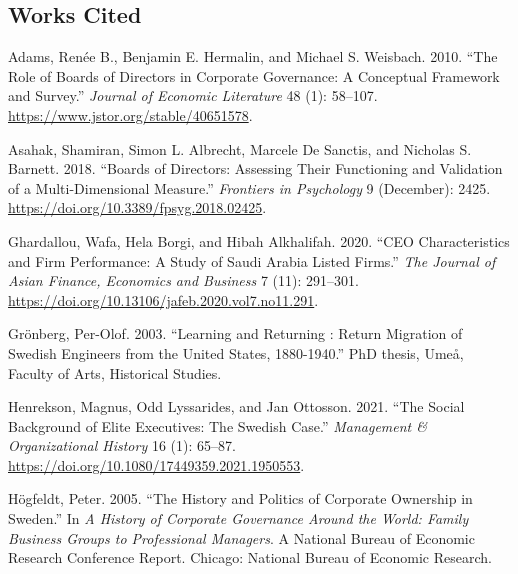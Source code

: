 \documentclass[
]{article}
\newlength{\cslhangindent}
\newenvironment{CSLReferences}[2] %
 {\begin{list}{}{%
  \setlength{\itemindent}{0pt}
  \setlength{\leftmargin}{0pt}
  \setlength{\parsep}{0pt}
  \ifodd #1
   \setlength{\leftmargin}{\cslhangindent}
   \setlength{\itemindent}{-1\cslhangindent}
  \fi
  \setlength{\itemsep}{#2\baselineskip}}}
 {\end{list}}
\begin{document}
\newpage{}

\subsection*{Works Cited}\label{works-cited}

\label{refs}
\begin{CSLReferences}{1}{0}
Adams, Renée B., Benjamin E. Hermalin, and Michael S. Weisbach. 2010.
{``The {Role} of {Boards} of {Directors} in {Corporate Governance}: {A
Conceptual Framework} and {Survey}.''} \emph{Journal of Economic
Literature} 48 (1): 58--107.
\url{https://www.jstor.org/stable/40651578}.

Asahak, Shamiran, Simon L. Albrecht, Marcele De Sanctis, and Nicholas S.
Barnett. 2018. {``Boards of {Directors}: {Assessing Their Functioning}
and {Validation} of a {Multi-Dimensional Measure}.''} \emph{Frontiers in
Psychology} 9 (December): 2425.
\url{https://doi.org/10.3389/fpsyg.2018.02425}.

Ghardallou, Wafa, Hela Borgi, and Hibah Alkhalifah. 2020. {``{CEO
Characteristics} and {Firm Performance}: {A Study} of {Saudi Arabia
Listed Firms}.''} \emph{The Journal of Asian Finance, Economics and
Business} 7 (11): 291--301.
\url{https://doi.org/10.13106/jafeb.2020.vol7.no11.291}.

Grönberg, Per-Olof. 2003. {``Learning and {Returning} : {Return
Migration} of {Swedish Engineers} from the {United States},
1880-1940.''} PhD thesis, Ume{å}, Faculty of Arts, Historical Studies.

Henrekson, Magnus, Odd Lyssarides, and Jan Ottosson. 2021. {``The Social
Background of Elite Executives: The {Swedish} Case.''} \emph{Management
\& Organizational History} 16 (1): 65--87.
\url{https://doi.org/10.1080/17449359.2021.1950553}.

Högfeldt, Peter. 2005. {``The {History} and {Politics} of {Corporate
Ownership} in {Sweden}.''} In \emph{A History of Corporate Governance
Around the World: Family Business Groups to Professional Managers}. A
{National} Bureau of Economic Research Conference Report. Chicago:
National Bureau of Economic Research.


\end{CSLReferences}
\end{document}
